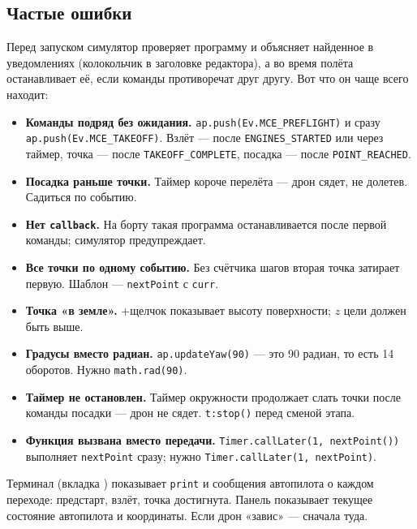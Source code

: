 \subsection{Частые ошибки}

Перед запуском симулятор проверяет программу и объясняет найденное в уведомлениях (колокольчик в заголовке редактора), а во время полёта останавливает её, если команды противоречат друг другу. Вот что он чаще всего находит:

\begin{itemize}
    \item \textbf{Команды подряд без ожидания.} \verb|ap.push(Ev.MCE_PREFLIGHT)| и сразу \verb|ap.push(Ev.MCE_TAKEOFF)|. Взлёт --- после \verb|ENGINES_STARTED| или через таймер, точка --- после \verb|TAKEOFF_COMPLETE|, посадка --- после \verb|POINT_REACHED|.
    \item \textbf{Посадка раньше точки.} Таймер короче перелёта --- дрон сядет, не долетев. Садиться по событию.
    \item \textbf{Нет \texttt{callback}.} На борту такая программа останавливается после первой команды; симулятор предупреждает.
    \item \textbf{Все точки по одному событию.} Без счётчика шагов вторая точка затирает первую. Шаблон --- \verb|nextPoint| с \verb|curr|.
    \item \textbf{Точка «в земле».} +щелчок показывает высоту поверхности; $z$ цели должен быть выше.
    \item \textbf{Градусы вместо радиан.} \verb|ap.updateYaw(90)| --- это 90 радиан, то есть 14 оборотов. Нужно \verb|math.rad(90)|.
    \item \textbf{Таймер не остановлен.} Таймер окружности продолжает слать точки после команды посадки --- дрон не сядет. \verb|t:stop()| перед сменой этапа.
    \item \textbf{Функция вызвана вместо передачи.} \verb|Timer.callLater(1, nextPoint())| выполняет \verb|nextPoint| сразу; нужно \verb|Timer.callLater(1, nextPoint)|.
\end{itemize}

\begin{hintbox}
Терминал (вкладка ) показывает \verb|print| и сообщения автопилота о каждом переходе: предстарт, взлёт, точка достигнута. Панель  показывает текущее состояние автопилота и координаты. Если дрон «завис» --- сначала туда.
\end{hintbox}
